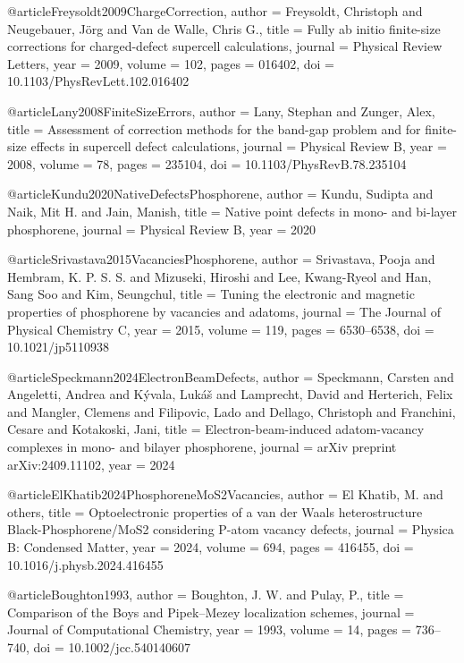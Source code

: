 @article{Freysoldt2009ChargeCorrection,
  author  = {Freysoldt, Christoph and Neugebauer, J{\"o}rg and Van de Walle, Chris G.},
  title   = {Fully ab initio finite-size corrections for charged-defect supercell calculations},
  journal = {Physical Review Letters},
  year    = {2009},
  volume  = {102},
  pages   = {016402},
  doi     = {10.1103/PhysRevLett.102.016402}
}

@article{Lany2008FiniteSizeErrors,
  author  = {Lany, Stephan and Zunger, Alex},
  title   = {Assessment of correction methods for the band-gap problem and for finite-size effects in supercell defect calculations},
  journal = {Physical Review B},
  year    = {2008},
  volume  = {78},
  pages   = {235104},
  doi     = {10.1103/PhysRevB.78.235104}
}

@article{Kundu2020NativeDefectsPhosphorene,
  author  = {Kundu, Sudipta and Naik, Mit H. and Jain, Manish},
  title   = {Native point defects in mono- and bi-layer phosphorene},
  journal = {Physical Review B},
  year    = {2020}
}

@article{Srivastava2015VacanciesPhosphorene,
  author  = {Srivastava, Pooja and Hembram, K. P. S. S. and Mizuseki, Hiroshi and Lee, Kwang-Ryeol and Han, Sang Soo and Kim, Seungchul},
  title   = {Tuning the electronic and magnetic properties of phosphorene by vacancies and adatoms},
  journal = {The Journal of Physical Chemistry C},
  year    = {2015},
  volume  = {119},
  pages   = {6530--6538},
  doi     = {10.1021/jp5110938}
}

@article{Speckmann2024ElectronBeamDefects,
  author  = {Speckmann, Carsten and Angeletti, Andrea and Kývala, Lukáš and Lamprecht, David and Herterich, Felix and Mangler, Clemens and Filipovic, Lado and Dellago, Christoph and Franchini, Cesare and Kotakoski, Jani},
  title   = {Electron-beam-induced adatom-vacancy complexes in mono- and bilayer phosphorene},
  journal = {arXiv preprint arXiv:2409.11102},
  year    = {2024}
}

@article{ElKhatib2024PhosphoreneMoS2Vacancies,
  author  = {El Khatib, M. and others},
  title   = {Optoelectronic properties of a van der Waals heterostructure Black-Phosphorene/MoS2 considering P-atom vacancy defects},
  journal = {Physica B: Condensed Matter},
  year    = {2024},
  volume  = {694},
  pages   = {416455},
  doi     = {10.1016/j.physb.2024.416455}
}


@article{Boughton1993,
  author = {Boughton, J. W. and Pulay, P.},
  title = {Comparison of the Boys and Pipek--Mezey localization schemes},
  journal = {Journal of Computational Chemistry},
  year = {1993},
  volume = {14},
  pages = {736--740},
  doi = {10.1002/jcc.540140607}
}

